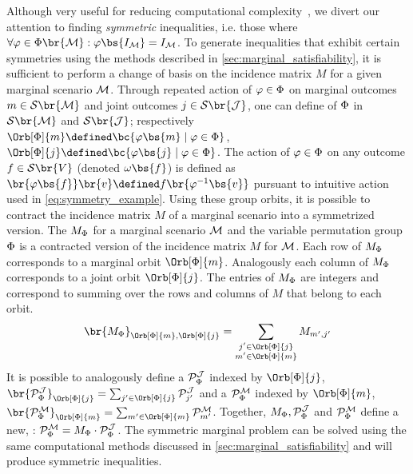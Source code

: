 \documentclass[aps, 10pt, english, twoside, pra, nofootinbib, tightenlines, longbibliography, superscriptaddress]{revtex4-1}
\renewcommand{\Events}[1]{\mathcal{S}\br{#1}} %
\begin{document}
    Although very useful for reducing computational complexity~\cite{Bancal_2010}, we divert our attention to finding \textit{symmetric} inequalities, i.e. those where $\forall \varphi \in \gp\br{\mscenario} :  \varphi\bs{I_{\mscenario}} = I_{\mscenario}$. To generate inequalities that exhibit certain symmetries using the methods described in \cref{sec:marginal_satisfiability}, it is sufficient to perform a change of basis on the incidence matrix $M$ for a given marginal scenario $\mathcal{M}$. Through repeated action of $\varphi \in \Phi$ on marginal outcomes $m \in \Events{\mscenario}$ and joint outcomes $j \in \Events{\jointvar}$, one can define  of $\Phi$ in $\Events{\mscenario}$ and $\Events{\jointvar}$; respectively $\Orb[\gp]{m} \defined \bc{\varphi\bs{m} \mid \varphi \in \gp}$, $\Orb[\gp]{j} \defined \bc{\varphi\bs{j} \mid \varphi \in \gp}$. The action of $\varphi \in \Phi$ on any outcome $f \in \Events{V}$ (denoted $\geo\bs{f}$) is defined as $\br{\varphi\bs{f}}\br{v} \defined f\br{\varphi^{-1}\bs{v}}$ pursuant to intuitive action used in \cref{eq:symmetry_example}. Using these group orbits, it is possible to contract the incidence matrix $M$ of a marginal scenario into a symmetrized version. The  $M_{\Phi}$ for a marginal scenario $\mathcal{M}$ and the variable permutation group $\Phi$ is a contracted version of the incidence matrix $M$ for $\mathcal{M}$. Each row of $M_{\Phi}$ corresponds to a marginal orbit $\Orb[\gp]{m}$. Analogously each column of $M_{\Phi}$ corresponds to a joint orbit $\Orb[\gp]{j}$. The entries of $M_{\Phi}$ are integers and correspond to summing over the rows and columns of $M$ that belong to each orbit.
    \[ \br{M_{\gp}}_{\Orb[\gp]{m}, \Orb[\gp]{j}} = \sum_{\substack{j' \in \Orb[\gp]{j} \\ m' \in \Orb[\gp]{m}}} M_{m',j'} \]
    It is possible to analogously define a  $\probvec^{\jointvar}_{\Phi}$ indexed by $\Orb[\gp]{j}$, $\br{\probvec^{\jointvar}_{\Phi}}_{\Orb[\gp]{j}} = \sum_{j' \in \Orb[\gp]{j}} \probvec^{\jointvar}_{j'}$ and a  $\probvec^{\mscenario}_{\Phi}$ indexed by $\Orb[\gp]{m}$, $\br{\probvec^{\mscenario}_{\Phi}}_{\Orb[\gp]{m}} = \sum_{m' \in \Orb[\gp]{m}} \probvec^{\mscenario}_{m'}$. Together, $M_{\gp}, \probvec^{\jointvar}_{\Phi}$ and $\probvec^{\mscenario}_{\Phi}$ define a new, : $\probvec^{\mscenario}_{\Phi} = M_{\gp} \cdot \probvec^{\jointvar}_{\Phi}$. The symmetric marginal problem can be solved using the same computational methods discussed in \cref{sec:marginal_satisfiability} and will produce symmetric inequalities.
\end{document}
